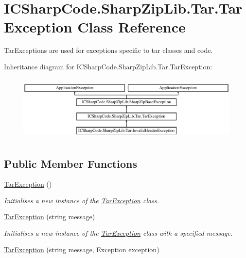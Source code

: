 \hypertarget{class_i_c_sharp_code_1_1_sharp_zip_lib_1_1_tar_1_1_tar_exception}{}\section{I\+C\+Sharp\+Code.\+Sharp\+Zip\+Lib.\+Tar.\+Tar\+Exception Class Reference}
\label{class_i_c_sharp_code_1_1_sharp_zip_lib_1_1_tar_1_1_tar_exception}


Tar\+Exceptions are used for exceptions specific to tar classes and code.  


Inheritance diagram for I\+C\+Sharp\+Code.\+Sharp\+Zip\+Lib.\+Tar.\+Tar\+Exception\+:\begin{figure}[H]
\begin{center}
\leavevmode
\includegraphics[height=3.383686cm]{class_i_c_sharp_code_1_1_sharp_zip_lib_1_1_tar_1_1_tar_exception}
\end{center}
\end{figure}
\subsection*{Public Member Functions}
\begin{DoxyCompactItemize}
\item 
\hyperlink{class_i_c_sharp_code_1_1_sharp_zip_lib_1_1_tar_1_1_tar_exception_adb9be44bd38738dba809c60c9c33c8f4}{Tar\+Exception} ()
\begin{DoxyCompactList}\small\item\em Initialises a new instance of the \hyperlink{class_i_c_sharp_code_1_1_sharp_zip_lib_1_1_tar_1_1_tar_exception}{Tar\+Exception} class. \end{DoxyCompactList}\item 
\hyperlink{class_i_c_sharp_code_1_1_sharp_zip_lib_1_1_tar_1_1_tar_exception_aeffc17bee429f1b3b72e26d3babb4bda}{Tar\+Exception} (string message)
\begin{DoxyCompactList}\small\item\em Initialises a new instance of the \hyperlink{class_i_c_sharp_code_1_1_sharp_zip_lib_1_1_tar_1_1_tar_exception}{Tar\+Exception} class with a specified message. \end{DoxyCompactList}\item 
\hyperlink{class_i_c_sharp_code_1_1_sharp_zip_lib_1_1_tar_1_1_tar_exception_a3c4043e1a4159997f151cb619efeec11}{Tar\+Exception} (string message, Exception exception)
\end{DoxyCompactItemize}
